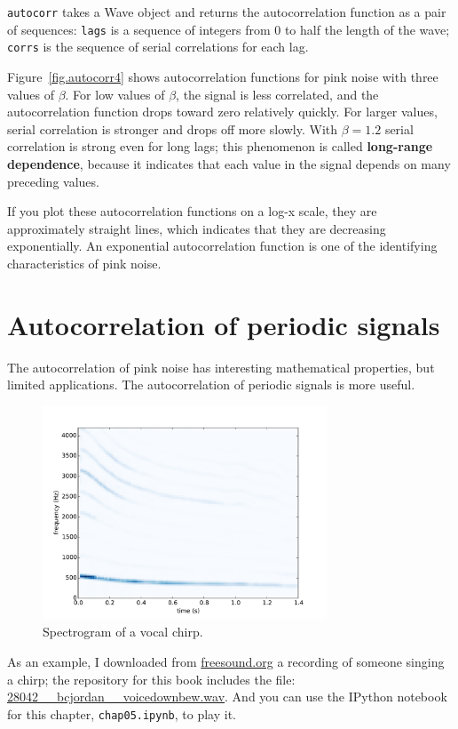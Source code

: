 \documentclass[12pt]{book}
\begin{document}
{\tt autocorr} takes a Wave object and returns the autocorrelation
function as a pair of sequences: {\tt lags} is a sequence of
integers from 0 to half the length of the wave; {\tt corrs}
is the sequence of serial correlations for each lag.

Figure~\ref{fig.autocorr4} shows autocorrelation functions for pink
noise with three values of $\beta$.  For low values of $\beta$, the
signal is less correlated, and the autocorrelation function drops
toward zero relatively quickly.  For larger values, serial correlation
is stronger and drops off more slowly.  With $\beta=1.2$ serial
correlation is strong even for long lags; this phenomenon is called
{\bf long-range dependence}, because it indicates that each value in
the signal depends on many preceding values.

If you plot these autocorrelation functions on a log-x scale, they
are approximately straight lines, which indicates that they are
decreasing exponentially.  An exponential autocorrelation function
is one of the identifying characteristics of pink noise.


\section{Autocorrelation of periodic signals}

The autocorrelation of pink noise has interesting mathematical
properties, but limited applications.  The autocorrelation of
periodic signals is more useful.

\begin{figure}
\centerline{\includegraphics[height=2.5in]{figs/autocorr5.pdf}}
\caption{Spectrogram of a vocal chirp.}
\label{fig.autocorr5}
\end{figure}

As an example, I downloaded from \url{freesound.org} a recording of
someone singing a chirp; the repository for this book includes the
file: \url{28042__bcjordan__voicedownbew.wav}.  And you can use the
IPython notebook for this chapter, {\tt chap05.ipynb}, to play it.
\end{document}
